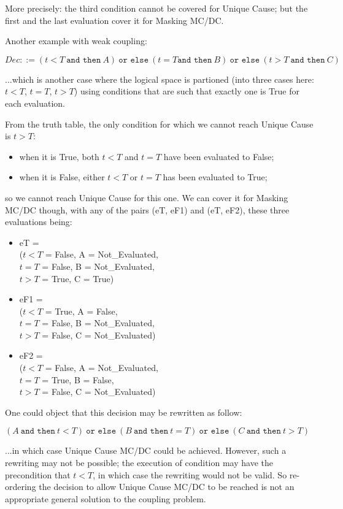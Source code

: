 \documentclass[a4paper,12pt,twoside]{article}
\newcommand{\andthen}{\texttt{and then}}
\newcommand{\orelse}{\texttt{or else}}
\begin{document}
More precisely: the third condition cannot be covered for Unique Cause;
but the first and the last evaluation cover it for Masking MC/DC.

Another example with weak coupling:

$Dec ::= (t < T \ \andthen{} \ A)
  \ \orelse{} \ (t = T \andthen{} \ B)
  \ \orelse{} \ (t > T \ \andthen{} \ C)$

...which is another case where the logical space is partioned (into three
cases here: $t < T$, $t = T$, $t > T$) using conditions that are such
that exactly one is True for each evaluation.

From the truth table, the only condition for which we cannot reach
Unique Cause is $t > T$:
\begin{itemize}
\item when it is True, both $t < T$ and $t = T$ have been evaluated to False;
\item when it is False, either $t < T$ or $t = T$ has been evaluated to True;
\end{itemize}
so we cannot reach Unique Cause for this one. We can cover it for
Masking MC/DC though, with any of the pairs (eT, eF1) and
(eT, eF2), these three evaluations being:
\begin{itemize}
\item eT = \\
($t < T$ = False, A = Not\_Evaluated,\\
 $t = T$ = False, B = Not\_Evaluated,\\
 $t > T$ = True,  C = True)

\item eF1 = \\
($t < T$ = True,  A = False,\\
 $t = T$ = False, B = Not\_Evaluated,\\
 $t > T$ = False, C = Not\_Evaluated)

\item eF2 = \\
($t < T$ = False, A = Not\_Evaluated,\\
 $t = T$ = True,  B = False,\\
 $t > T$ = False, C = Not\_Evaluated)
\end{itemize}

One could object that this decision may be rewritten as follow:

$(A \ \andthen{} \ t < T)
  \ \orelse{} \ (B \ \andthen{} \ t = T)
  \ \orelse{} \ (C \ \andthen{} \ t > T)$

...in which case Unique Cause MC/DC could be achieved. However, such a
rewriting may not be possible; the execution of condition may have the
precondition that $t < T$, in which case the rewriting would not be
valid. So re-ordering the decision to allow Unique Cause MC/DC to be
reached is not an appropriate general solution to the coupling
problem.
\end{document}
